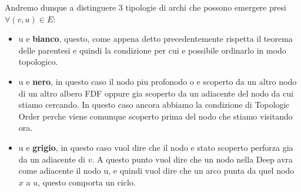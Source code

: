 Andremo dunque a distinguere 3 tipologie di archi che possono emergere presi\newline
$\forall (v,u) \in E$:
\begin{itemize}
	\item u e \textbf{bianco}, questo, come appena detto precedentemente rispetta il teorema delle parentesi e quindi la condizione per cui e possibile ordinarlo in modo topologico.
	\item u e \textbf{nero}, in questo caso il nodo piu profonodo o e scoperto da un altro nodo di un altro albero FDF oppure gia scoperto da un adiacente del nodo da cui stiamo cercando. In questo caso ancora abbiamo la condizione di Topologic Order perche viene comunque scoperto prima del nodo che stiamo visitando ora.
	\item u e \textbf{grigio}, in questo caso vuol dire che il nodo e stato scoperto perforza gia da un adiacente di $v$. A questo punto vuol dire che un nodo nella Deep avra come adiacente il nodo u, e quindi vuol dire che un arco punta da quel nodo $x$ a $u$, questo comporta un ciclo.
\end{itemize}
